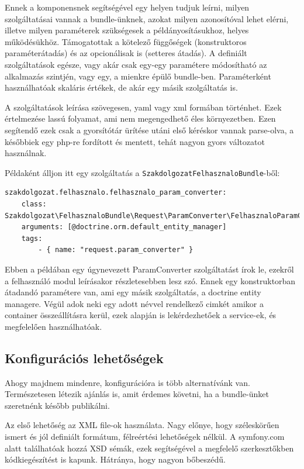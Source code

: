 \documentclass[a4paper,12pt,oneside]{report}
\begin{document}
Ennek a komponensnek segítségével egy helyen tudjuk leírni, milyen szolgáltatásai vannak a bundle-ünknek, azokat milyen azonosítóval lehet elérni, illetve milyen paraméterek szükségesek a példányosításukhoz, helyes működésükhöz. Támogatottak a kötelező függőségek (konstruktoros paraméterátadás) és az opcionálisak is (setteres átadás). A definiált szolgáltatások egésze, vagy akár csak egy-egy paramétere módosítható az alkalmazás szintjén, vagy egy, a mienkre épülő bundle-ben. Paraméterként használhatóak skaláris értékek, de akár egy másik szolgáltatás is.

A szolgáltatások leírása szövegesen, yaml vagy xml formában történhet. Ezek értelmezése lassú folyamat, ami nem megengedhető éles környezetben. Ezen segítendő ezek csak a gyorsítótár ürítése utáni első kéréskor vannak parse-olva, a későbbiek egy php-re fordított és mentett, tehát nagyon gyors változatot használnak.

Példaként álljon itt egy szolgáltatás a \texttt{SzakdolgozatFelhasznaloBundle}-ből:

\begin{lstlisting}[]
szakdolgozat.felhasznalo.felhasznalo_param_converter:
    class: Szakdolgozat\FelhasznaloBundle\Request\ParamConverter\FelhasznaloParamConverter
    arguments: [@doctrine.orm.default_entity_manager]
    tags:
        - { name: "request.param_converter" }
\end{lstlisting}

Ebben a példában egy úgynevezett ParamConverter szolgáltatást írok le, ezekről a felhasználó modul leírásakor részletesebben lesz szó. Ennek egy konstruktorban átadandó paramétere van, ami egy másik szolgáltatás, a doctrine entity managere. Végül adok neki egy adott névvel rendelkező cimkét \textendash{} amikor a container összeállításra kerül, ezek alapján is lekérdezhetőek a service-ek, és megfelelően használhatóak.

\subsection*{Konfigurációs lehetőségek}

Ahogy majdnem mindenre, konfigurációra is több alternatívánk van. Természetesen létezik ajánlás is, amit érdemes követni, ha a bundle-ünket szeretnénk később publikálni.

Az első lehetőség az XML file-ok használata. Nagy előnye, hogy széleskörűen ismert és jól definiált formátum, félreértési lehetőségek nélkül. A symfony.com alatt találhatóak hozzá XSD sémák, ezek segítségével a megfelelő szerkesztőkben kódkiegészítést is kapunk. Hátránya, hogy nagyon bőbeszédű.
\end{document}
